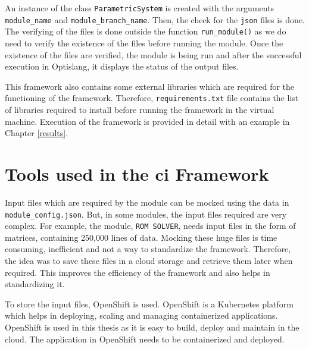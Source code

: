 An instance of the class \texttt{ParametricSystem} 
is created with the arguments \texttt{module\_name} and \texttt{module\_branch\_name}. Then, the check for the \texttt{\acrshort{json}} files is done. 
The verifying of the files is done outside the function \texttt{run\_module()} as we do need to verify the existence of the files before running the module.
Once the existence of the files are verified, the module is being run and after the successful execution in Optislang, it displays the status of the output
files. 

This framework also contains some external libraries which are required for the functioning of the framework. Therefore, \texttt{requirements.txt} file contains the list of libraries
required to install before running the framework in the virtual machine. Execution of the framework is provided in detail with an example in Chapter \ref{results}.

\section{Tools used in the \acrshort{ci} Framework} \label{retrieve_input_files}
Input files which are required by the module can be mocked using the data in \texttt{module\_config.json}. But, in some modules, the input files required are very complex. For example, the module, \texttt{ROM SOLVER}, needs input files in the form of 
matrices, containing 250,000 lines of data. Mocking these huge files is time consuming, inefficient and not a way to standardize the framework. Therefore,
the idea was to save these files in a cloud storage and retrieve them later when required. This improves the efficiency of the framework and also helps in
standardizing it. 

To store the input files, OpenShift is used. OpenShift\cite{openshift} is a Kubernetes platform which helps in deploying, scaling and managing containerized applications. 
OpenShift is used in this thesis as it is easy to build, deploy and maintain in the cloud. The application in OpenShift needs to be containerized and deployed. 

